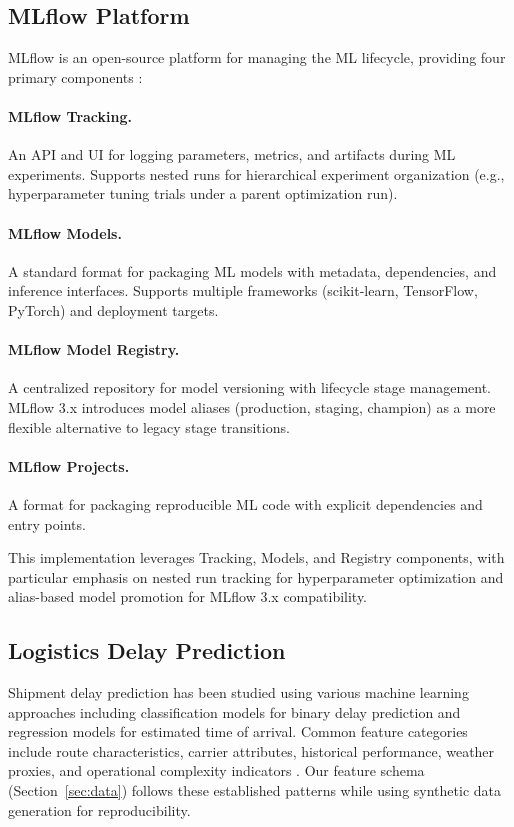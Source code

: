 \documentclass[11pt,a4paper]{article}
\begin{document}
\subsection{MLflow Platform}

MLflow is an open-source platform for managing the ML lifecycle, providing four primary components \cite{mlflow-docs}:

\paragraph{MLflow Tracking.}
An API and UI for logging parameters, metrics, and artifacts during ML experiments. Supports nested runs for hierarchical experiment organization (e.g., hyperparameter tuning trials under a parent optimization run).

\paragraph{MLflow Models.}
A standard format for packaging ML models with metadata, dependencies, and inference interfaces. Supports multiple frameworks (scikit-learn, TensorFlow, PyTorch) and deployment targets.

\paragraph{MLflow Model Registry.}
A centralized repository for model versioning with lifecycle stage management. MLflow 3.x introduces model aliases (production, staging, champion) as a more flexible alternative to legacy stage transitions.

\paragraph{MLflow Projects.}
A format for packaging reproducible ML code with explicit dependencies and entry points.

This implementation leverages Tracking, Models, and Registry components, with particular emphasis on nested run tracking for hyperparameter optimization and alias-based model promotion for MLflow 3.x compatibility.

\subsection{Logistics Delay Prediction}

Shipment delay prediction has been studied using various machine learning approaches including classification models for binary delay prediction and regression models for estimated time of arrival. Common feature categories include route characteristics, carrier attributes, historical performance, weather proxies, and operational complexity indicators \cite{logistics-ml}. Our feature schema (Section~\ref{sec:data}) follows these established patterns while using synthetic data generation for reproducibility.
\end{document}
